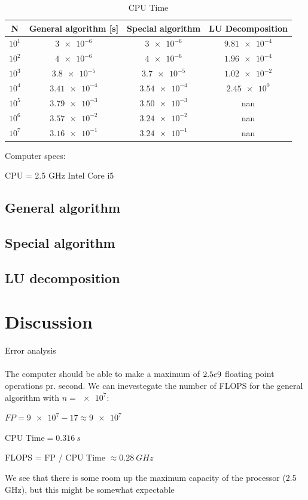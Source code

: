 \documentclass[american,a4paper,12pt]{article}
\begin{document}
  \begin{table}[H]
    \begin{center}
    \caption{CPU Time}
    \begin{tabular}{|c|c|c|c|} \hline
    \textbf{N} & \textbf{General algorithm [s]} & \textbf{Special algorithm} & \textbf{LU Decomposition} \\ \hline
    $10^1$ & $\num{3e-6}$     & $\num{3e-6}$    & $\num{9.81e-4}$ \\ \hline
    $10^2$ & $\num{4e-6}$     & $\num{4e-6}$    & $\num{1.96e-4}$ \\ \hline
    $10^3$ & $\num{3.8e-5}$   & $\num{3.7e-5}$  & $\num{1.02e-2}$ \\ \hline
    $10^4$ & $\num{3.41e-4}$  & $\num{3.54e-4}$ & $\num{2.45e0}$ \\ \hline
    $10^5$ & $\num{3.79e-3}$  & $\num{3.50e-3}$ & nan \\ \hline
    $10^6$ & $\num{3.57e-2}$  & $\num{3.24e-2}$ & nan \\ \hline
    $10^7$ & $\num{3.16e-1}$  & $\num{3.24e-1}$ & nan \\ \hline
    \end{tabular}
    \end{center}
    \label{tab:final_res}
  \end{table}

  Computer specs:
  \begin{center}
    CPU = 2.5 GHz Intel Core i5
  \end{center}


\subsection{General algorithm}

\subsection{Special algorithm}

\subsection{LU decomposition}

\section{Discussion}
Error analysis \\
\\
The computer should be able to make a maximum of $\num2.5e9$ floating point operations pr. second. We can inevestegate the number of FLOPS for the general algorithm with $n = \num{e7}$:
\begin{center}
  $FP = \num{9e7} - 17 \approx \num{9e7}$
\end{center}
\begin{center}
  $\text{CPU Time} = 0.316 \ s$
\end{center}
\begin{center}
  FLOPS = FP / CPU Time $\approx 0.28 \ GHz$
\end{center}
We see that there is some room up the maximum capacity of the processor (2.5 GHz), but this might be somewhat expectable
\end{document}
